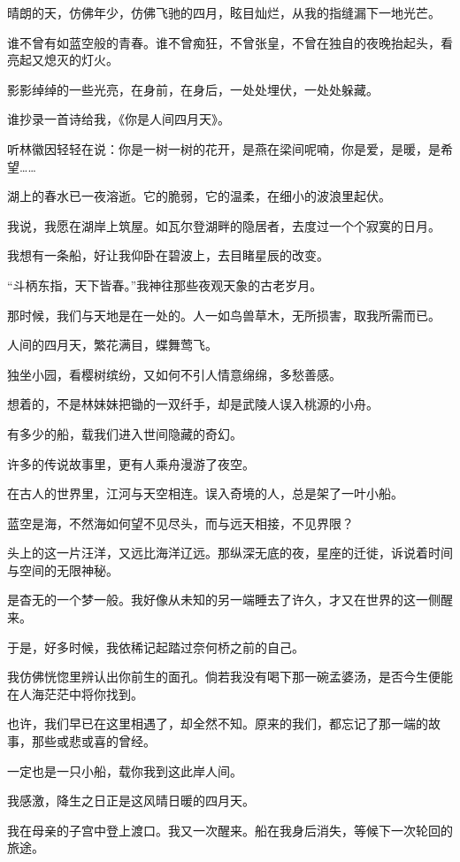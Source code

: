 \documentclass[12pt,a4paper]{article}
\begin{document}
		晴朗的天，仿佛年少，仿佛飞驰的四月，眩目灿烂，从我的指缝漏下一地光芒。\par
		谁不曾有如蓝空般的青春。谁不曾痴狂，不曾张皇，不曾在独自的夜晚抬起头，看亮起又熄灭的灯火。\par
		影影绰绰的一些光亮，在身前，在身后，一处处埋伏，一处处躲藏。\par
		谁抄录一首诗给我，《你是人间四月天》。\par
		听林徽因轻轻在说：你是一树一树的花开，是燕在梁间呢喃，你是爱，是暖，是希望……\par
		湖上的春水已一夜溶逝。它的脆弱，它的温柔，在细小的波浪里起伏。\par
		我说，我愿在湖岸上筑屋。如瓦尔登湖畔的隐居者，去度过一个个寂寞的日月。\par
		我想有一条船，好让我仰卧在碧波上，去目睹星辰的改变。\par
		“斗柄东指，天下皆春。”我神往那些夜观天象的古老岁月。\par
		那时候，我们与天地是在一处的。人一如鸟兽草木，无所损害，取我所需而已。\par
		人间的四月天，繁花满目，蝶舞莺飞。\par
		独坐小园，看樱树缤纷，又如何不引人情意绵绵，多愁善感。\par
		想着的，不是林妹妹把锄的一双纤手，却是武陵人误入桃源的小舟。\par
		有多少的船，载我们进入世间隐藏的奇幻。\par
		许多的传说故事里，更有人乘舟漫游了夜空。\par
		在古人的世界里，江河与天空相连。误入奇境的人，总是架了一叶小船。\par
		蓝空是海，不然海如何望不见尽头，而与远天相接，不见界限？\par
		头上的这一片汪洋，又远比海洋辽远。那纵深无底的夜，星座的迁徙，诉说着时间与空间的无限神秘。\par
		是杳无的一个梦一般。我好像从未知的另一端睡去了许久，才又在世界的这一侧醒来。\par
		于是，好多时候，我依稀记起踏过奈何桥之前的自己。\par
		我仿佛恍惚里辨认出你前生的面孔。倘若我没有喝下那一碗孟婆汤，是否今生便能在人海茫茫中将你找到。\par
		也许，我们早已在这里相遇了，却全然不知。原来的我们，都忘记了那一端的故事，那些或悲或喜的曾经。\par
		一定也是一只小船，载你我到这此岸人间。\par
		我感激，降生之日正是这风晴日暖的四月天。\par
		我在母亲的子宫中登上渡口。我又一次醒来。船在我身后消失，等候下一次轮回的旅途。\par
\end{document}
